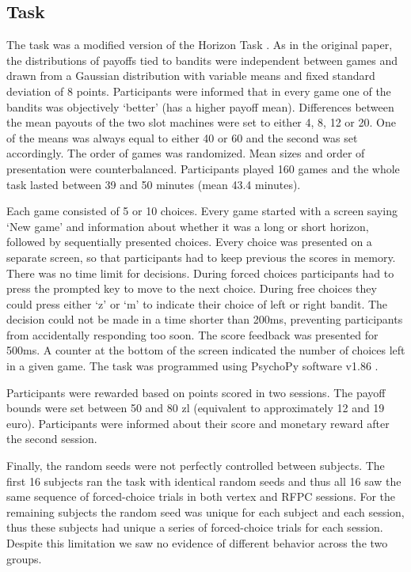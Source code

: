 \documentclass[12pt]{article}
\begin{document}
\subsection*{Task}
The task was a modified version of the Horizon Task \cite{Wilson2014-ob}. As in the original paper, the distributions of payoffs tied to bandits were independent between games and drawn from a Gaussian distribution with variable means and fixed standard deviation of 8 points. Participants were informed that in every game one of the bandits was objectively `better' (has a higher payoff mean). Differences between the mean payouts of the two slot machines were set to either 4, 8, 12 or 20. One of the means was always equal to either 40 or 60 and the second was set accordingly. The order of games was randomized. Mean sizes and order of presentation were counterbalanced. Participants played 160 games and the whole task lasted between 39 and 50 minutes (mean 43.4 minutes). 

Each game consisted of 5 or 10 choices. Every game started with a screen saying `New game' and information about whether it was a long or short horizon, followed by sequentially presented choices. Every choice was presented on a separate screen, so that participants had to keep previous the scores in memory. There was no time limit for decisions. During forced choices participants had to press the prompted key to move to the next choice. During free choices they could press either `z' or `m' to indicate their choice of left or right bandit. The decision could not be made in a time shorter than 200ms, preventing participants from accidentally responding too soon. The score feedback was presented for 500ms. A counter at the bottom of the screen indicated the number of choices left in a given game. The task was programmed using PsychoPy software v1.86 \cite{Peirce2007-gr}.

Participants were rewarded based on points scored in two sessions. The payoff bounds were set between 50 and 80 zl (equivalent to approximately 12 and 19 euro). Participants were informed about their score and monetary reward after the second session.

Finally, the random seeds were not perfectly controlled between subjects.  The first 16 subjects ran the task with identical random seeds and thus all 16 saw the same sequence of forced-choice trials in both vertex and RFPC sessions. For the remaining subjects the random seed was unique for each subject and each session, thus these subjects had unique a series of forced-choice trials for each session.  Despite this limitation we saw no evidence of different behavior across the two groups.
\end{document}
